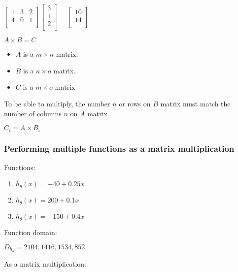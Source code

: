 \documentclass[a4paper]{report}
\begin{document}
        $\begin{bmatrix}
          1 & 3 & 2 \\
          4 & 0 & 1 \\
        \end{bmatrix}
        \begin{bmatrix}
          3 \\
          1 \\
          2 \\
        \end{bmatrix}
        =
        \begin{bmatrix}
          10 \\
          14 \\
        \end{bmatrix}$

        $A \times B = C$

        \begin{itemize}
          \item $A$ is a $m \times n$ matrix.
          \item $B$ is a $n \times o$ matrix.
          \item $C$ is a $m \times o$ matrix        \end{itemize}

        To be able to multiply, the number $n$ or rows on $B$ matrix must match the number of columns $n$ on $A$ matrix.

        $C_{i} = A \times B_{i}$

        \subsubsection{Performing multiple functions as a matrix multiplication}

          Functions:

          \begin{enumerate}
            \item $h_{\theta}(x) = -40 + 0.25x$
            \item $h_{\theta}(x) = 200 + 0.1x$
            \item $h_{\theta}(x) = -150 + 0.4x$
          \end{enumerate}

          Function domain:

          $D_{h_{\theta}} = {2104, 1416, 1534, 852}$

          As a matrix multiplication:
\end{document}
